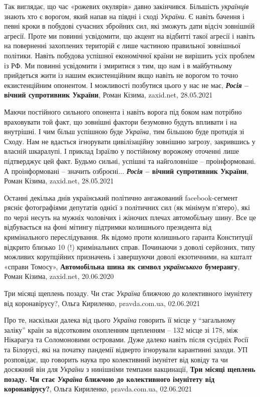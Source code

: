 Так виглядає, що час «рожевих окулярів» давно закінчився. Більшість \emph{українців}
знають хто є ворогом, який напав на півдні і сході \emph{України}. Є навіть бачення і
певні кроки в побудові сучасних збройних сил, які зможуть дати відсіч зовнішній
агресії. Проте ми повинні усвідомити, що акцент на відбитті такої агресії і
навіть на поверненні захоплених територій є лише частиною правильної зовнішньої
політики. Навіть побудова успішної економічної країни не вирішить усіх проблем
із РФ. Ми повинні усвідомити і змиритися з тим, що нам і в майбутньому
прийдеться жити із нашим екзистенційним якщо навіть не ворогом то точно
екзистенційним опонентом. І можливості позбутися цього у нас не має,
\textbf{\emph{Росія} – вічний супротивник України}, Роман Кізима, zaxid.net, 28.05.2021

Маючи постійного сильного опонента і навіть ворога під боком нам потрібно
враховувати той факт, що зовнішні фактори безумовно будуть впливати і на
внутрішні. І чим більш успішною буде \emph{Україна}, тим більшою буде протидія зі
Сходу. Нам не вдасться ігнорувати цивілізаційну зовнішню загрозу, закрившись у
власній шкаралупі. І приклад Ізраїлю у постійному ворожому оточенні лише
підтверджує цей факт. Будьмо сильні, успішні та найголовніше – проінформовані.
А проінформовані – значить озброєні...
\textbf{\emph{Росія} – вічний супротивник України}, Роман Кізима, zaxid.net, 28.05.2021

Останні декілька днів український політично ангажований facebook-сегмент рясніє
фотографіями депутатів однієї з політичних сил (як мінімум п'ятеро), які по
черзі несуть на мужніх чоловічих і жіночих плечах автомобільну шину. Все це
відбувається на фоні мітингу підтримки колишнього президента від кримінального
переслідування. Як відомо проти колишнього гаранта Конституції відкрито близько
10 (!) кримінальних справ. Починаючи з доволі серйозних, типу можливих
корупційних призначень і завершуючи доволі екзотичними, на кшталт «справи
Томосу»,
\textbf{Автомобільна шина як символ \emph{українського} бумерангу}, Роман Кізима, zaxid.net, 20.06.2020

Три місяці щеплень позаду. Чи стає \emph{Україна} ближчою до колективного
імунітету від коронавірусу?, Ольга Кириленко, pravda.com.ua, 02.06.2021

Про те, наскільки далека від цього \emph{Україна} говорить її місце у \enquote{загальному
заліку} країн за відсотковим охопленням щепленням – 132 місце зі 178, між
Нікарагуа та Соломоновими островами. Дуже далеко навіть після сусідніх Росії та
Білорусі, які на початку пандемії відверто ігнорували карантинні заходи.  УП
розповідає, що говорить наука про колективний імунітет від ковіду та чи
досяжний він для \emph{України} з нинішніми темпами вакцинації,
\textbf{Три місяці щеплень позаду. Чи стає \emph{Україна} ближчою до колективного
імунітету від коронавірусу?}, Ольга Кириленко, pravda.com.ua, 02.06.2021

